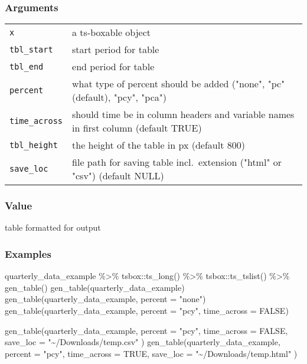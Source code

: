 \documentclass[
  letterpaper,
  DIV=11,
  numbers=noendperiod]{scrreport}
\newenvironment{Shaded}{\begin{snugshade}}{\end{snugshade}}
\newcommand{\AttributeTok}[1]{\textcolor[rgb]{0.40,0.45,0.13}{#1}}
\newcommand{\ConstantTok}[1]{\textcolor[rgb]{0.56,0.35,0.01}{#1}}
\newcommand{\FunctionTok}[1]{\textcolor[rgb]{0.28,0.35,0.67}{#1}}
\newcommand{\NormalTok}[1]{\textcolor[rgb]{0.00,0.23,0.31}{#1}}
\newcommand{\SpecialCharTok}[1]{\textcolor[rgb]{0.37,0.37,0.37}{#1}}
\newcommand{\StringTok}[1]{\textcolor[rgb]{0.13,0.47,0.30}{#1}}
\begin{document}
\subsubsection{Arguments}\label{arguments-6}

\begin{longtable}[]{@{}ll@{}}
\toprule\noalign{}
\endhead
\bottomrule\noalign{}
\endlastfoot
\texttt{x} & a ts-boxable object \\
\texttt{tbl\_start} & start period for table \\
\texttt{tbl\_end} & end period for table \\
\texttt{percent} & what type of percent should be added ("none", "pc"
(default), "pcy", "pca") \\
\texttt{time\_across} & should time be in column headers and variable
names in first column (default TRUE) \\
\texttt{tbl\_height} & the height of the table in px (default 800) \\
\texttt{save\_loc} & file path for saving table incl.~extension ("html"
or "csv") (default NULL) \\
\end{longtable}

\subsubsection{Value}\label{value-6}

table formatted for output

\subsubsection{Examples}\label{examples-6}

\begin{Shaded}
\begin{Highlighting}[]
\NormalTok{quarterly\_data\_example }\SpecialCharTok{\%\textgreater{}\%}
\NormalTok{  tsbox}\SpecialCharTok{::}\FunctionTok{ts\_long}\NormalTok{() }\SpecialCharTok{\%\textgreater{}\%}
\NormalTok{  tsbox}\SpecialCharTok{::}\FunctionTok{ts\_tslist}\NormalTok{() }\SpecialCharTok{\%\textgreater{}\%}
  \FunctionTok{gen\_table}\NormalTok{()}
\FunctionTok{gen\_table}\NormalTok{(quarterly\_data\_example)}
\FunctionTok{gen\_table}\NormalTok{(quarterly\_data\_example, }\AttributeTok{percent =} \StringTok{"none"}\NormalTok{)}
\FunctionTok{gen\_table}\NormalTok{(quarterly\_data\_example, }\AttributeTok{percent =} \StringTok{"pcy"}\NormalTok{, }\AttributeTok{time\_across =} \ConstantTok{FALSE}\NormalTok{)}

\FunctionTok{gen\_table}\NormalTok{(quarterly\_data\_example,}
  \AttributeTok{percent =} \StringTok{"pcy"}\NormalTok{,}
  \AttributeTok{time\_across =} \ConstantTok{FALSE}\NormalTok{, }\AttributeTok{save\_loc =} \StringTok{"\textasciitilde{}/Downloads/temp.csv"}
\NormalTok{)}
\FunctionTok{gen\_table}\NormalTok{(quarterly\_data\_example,}
  \AttributeTok{percent =} \StringTok{"pcy"}\NormalTok{, }\AttributeTok{time\_across =} \ConstantTok{TRUE}\NormalTok{,}
  \AttributeTok{save\_loc =} \StringTok{"\textasciitilde{}/Downloads/temp.html"}
\NormalTok{)}
\end{Highlighting}
\end{Shaded}
\end{document}
